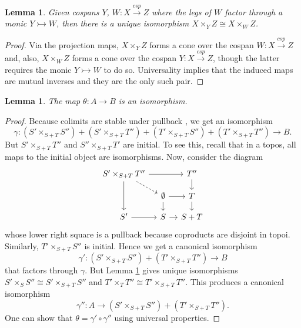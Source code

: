 \documentclass[11pt]{amsart}
\newcommand{\from}{\colon}
\newcommand{\cospan}{\xrightarrow{\mathit{csp}}}
\newtheorem{lem}[thm]{Lemma}
\theoremstyle{remark}
\theoremstyle{definition}
\begin{document}
\begin{lem}
	\label{lem:pullback over subobject}
	Given cospans $Y$, $W \from X \cospan Z$ where the legs of $W$ factor through a monic $Y \rightarrowtail W$, then there is a unique isomorphism $X \times_Y Z \cong X \times_W Z$. 
\end{lem}
\begin{proof}
	Via the projection maps, $X \times_Y Z$ forms a cone over the cospan $W \from X \cospan Z$ and, also, $X \times_W Z$ forms a cone over the cospan $Y \from X \cospan Z$, though the latter requires the monic $Y \rightarrowtail W$ to do so. Universality implies that the induced maps are mutual inverses and they are the only such pair.  
\end{proof}
%
%
%
%
%
%

\begin{lem}
\label{lem.Theta Iso}
	The map $\theta \from A \to B$ is an isomorphism.
\end{lem}
%
%
\begin{proof}
	Because colimits are stable under pullback \cite[Thm.~4.7.2]{MacLaneMoerdijk_SheavesGeomLogic}, we get an isomorphism
	\[
	\gamma \from (S'\times_{S+T}S'')
	+(S'\times_{S+T}T'')
	+(T'\times_{S+T}S'')
	+(T'\times_{S+T}T'') \to B.
	\]
	But $S'\times_{S+T}T''$ and $S''\times_{S+T}T'$ are initial. To see this, recall that in a topos, all maps to the initial object are isomorphisms. Now, consider the diagram
	\[
	\begin{tikzcd}[column sep=1em,row sep=1em]
	{S'\times_{S+T}T''} 
	\ar[rr]
	\ar[dd] 
	\ar[rd,dashed]& 
	{} & 
	{T''} 
	\ar[d]\\
	{} & 
	{\emptyset} 
	\ar[r]
	\ar[d] & 
	{T}
	\ar[d] \\
	{S'}
	\ar[r] & 
	{S} 
	\ar[r]& 
	{S+T} 
	\end{tikzcd}
	\]
	whose lower right square is a pullback because coproducts are disjoint in topoi.  Similarly, $T'\times_{S+T}S''$ is initial.  Hence we get a canonical isomorphism
	\begin{equation} \label{eq:B second iso}
	\gamma' \from 
	(S'\times_{S+T}S'')+(T'\times_{S+T}T'') 
	\to B
	\end{equation}
	that factors through $\gamma$. But Lemma \ref{lem:pullback over subobject} 
	gives unique isomorphisms $S' \times_{S} S'' \cong S' \times_{S+T} S''$ and $T'\times_{T} T'' \cong T' \times_{S+T} T''$. This produces a canonical isomorphism 
	\[
	\gamma'' \from A \to 
	(S'\times_{S+T}S'')+(T'\times_{S+T}T'').
	\]
	One can show that $\theta = \gamma' \circ 
	\gamma''$ 
	using universal properties.  
\end{proof}
\end{document}
